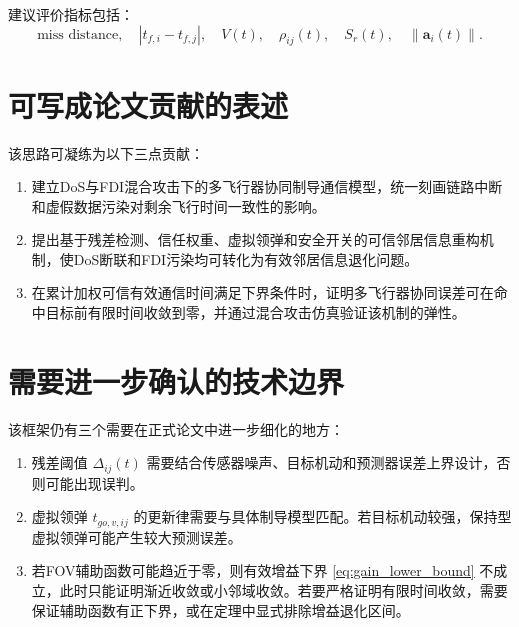 \documentclass[UTF8,a4paper,11pt]{ctexart}
\begin{document}
建议评价指标包括：
\[
\text{miss distance},\quad
|t_{f,i}-t_{f,j}|,\quad
V(t),\quad
\rho_{ij}(t),\quad
S_r(t),\quad
\|\bm a_i(t)\|.
\]

\section{可写成论文贡献的表述}

该思路可凝练为以下三点贡献：
\begin{enumerate}
\item 建立DoS与FDI混合攻击下的多飞行器协同制导通信模型，统一刻画链路中断和虚假数据污染对剩余飞行时间一致性的影响。
\item 提出基于残差检测、信任权重、虚拟领弹和安全开关的可信邻居信息重构机制，使DoS断联和FDI污染均可转化为有效邻居信息退化问题。
\item 在累计加权可信有效通信时间满足下界条件时，证明多飞行器协同误差可在命中目标前有限时间收敛到零，并通过混合攻击仿真验证该机制的弹性。
\end{enumerate}

\section{需要进一步确认的技术边界}

该框架仍有三个需要在正式论文中进一步细化的地方：
\begin{enumerate}
\item 残差阈值 $\Delta_{ij}(t)$ 需要结合传感器噪声、目标机动和预测器误差上界设计，否则可能出现误判。
\item 虚拟领弹 $t_{go,v,ij}$ 的更新律需要与具体制导模型匹配。若目标机动较强，保持型虚拟领弹可能产生较大预测误差。
\item 若FOV辅助函数可能趋近于零，则有效增益下界 \eqref{eq:gain_lower_bound} 不成立，此时只能证明渐近收敛或小邻域收敛。若要严格证明有限时间收敛，需要保证辅助函数有正下界，或在定理中显式排除增益退化区间。
\end{enumerate}
\end{document}
